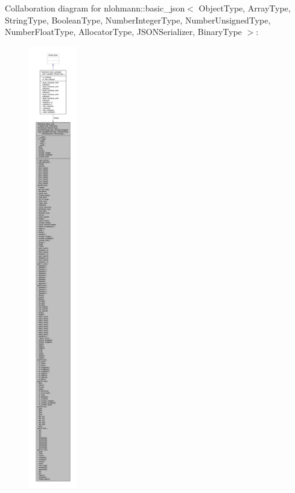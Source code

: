 Collaboration diagram for nlohmann\+:\+:basic\+\_\+json$<$ Object\+Type, Array\+Type, String\+Type, Boolean\+Type, Number\+Integer\+Type, Number\+Unsigned\+Type, Number\+Float\+Type, Allocator\+Type, J\+S\+O\+N\+Serializer, Binary\+Type $>$\+:
\nopagebreak
\begin{figure}[H]
\begin{center}
\leavevmode
\includegraphics[height=550pt]{classnlohmann_1_1basic__json__coll__graph}
\end{center}
\end{figure}
